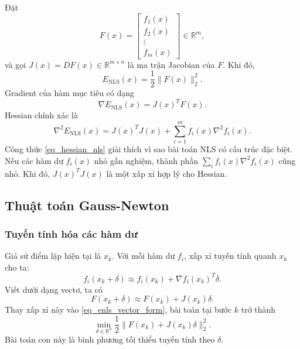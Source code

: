 Đặt
\begin{equation}
    F(x)=
    \begin{bmatrix}
        f_1(x)\\
        f_2(x)\\
        \vdots\\
        f_m(x)
    \end{bmatrix}
    \in\mathbb{R}^{m},
    \label{eq_vector_residual}
\end{equation}
và gọi $J(x)=DF(x)\in\mathbb{R}^{m\times n}$ là ma trận Jacobian của $F$. Khi đó,
\begin{equation}
    E_{\mathrm{NLS}}(x)=\frac{1}{2}\|F(x)\|_2^2.
    \label{eq_enls_vector_form}
\end{equation}
Gradient của hàm mục tiêu có dạng
\begin{equation}
    \nabla E_{\mathrm{NLS}}(x)=J(x)^{T}F(x).
    \label{eq_gradient_nls}
\end{equation}
Hessian chính xác là
\begin{equation}
    \nabla^2 E_{\mathrm{NLS}}(x)
    =J(x)^{T}J(x)+\sum_{i=1}^{m} f_i(x)\nabla^2 f_i(x).
    \label{eq_hessian_nls}
\end{equation}
Công thức \eqref{eq_hessian_nls} giải thích vì sao bài toán NLS có cấu trúc đặc biệt. Nếu các hàm dư $f_i(x)$ nhỏ gần nghiệm, thành phần $\sum_i f_i(x)\nabla^2f_i(x)$ cũng nhỏ. Khi đó, $J(x)^{T}J(x)$ là một xấp xỉ hợp lý cho Hessian.

\subsection{Thuật toán Gauss-Newton}
\label{SUB_SEC_gauss_newton}

\subsubsection*{Tuyến tính hóa các hàm dư}
Giả sử điểm lặp hiện tại là $x_k$. Với mỗi hàm dư $f_i$, xấp xỉ tuyến tính quanh $x_k$ cho ta:
\begin{equation}
    f_i(x_k+\delta)
    \approx f_i(x_k)+\nabla f_i(x_k)^{T}\delta.
    \label{eq_residual_linearization}
\end{equation}
Viết dưới dạng vectơ, ta có
\begin{equation}
    F(x_k+\delta)\approx F(x_k)+J(x_k)\delta.
    \label{eq_vector_linearization}
\end{equation}
Thay xấp xỉ này vào \eqref{eq_enls_vector_form}, bài toán tại bước $k$ trở thành
\begin{equation}
    \min_{\delta\in\mathbb{R}^{n}}
    \frac{1}{2}\|F(x_k)+J(x_k)\delta\|_2^2.
    \label{eq_gn_subproblem}
\end{equation}
Bài toán con này là bình phương tối thiểu tuyến tính theo $\delta$.
\medskip

